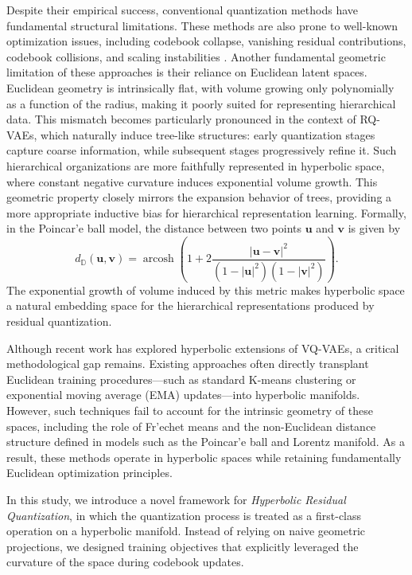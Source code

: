 \documentclass[12pt]{report}
\begin{document}
Despite their empirical success, conventional quantization methods have fundamental structural limitations. These methods are also prone to well-known optimization issues, including codebook collapse, vanishing residual contributions, codebook collisions, and scaling instabilities \cite{collapse_1}.
Another fundamental geometric limitation of these approaches is their reliance on Euclidean latent spaces. Euclidean geometry is intrinsically flat, with volume growing only polynomially as a function of the radius, making it poorly suited for representing hierarchical data. This mismatch becomes particularly pronounced in the context of RQ-VAEs, which naturally induce tree-like structures: early quantization stages capture coarse information, while subsequent stages progressively refine it. Such hierarchical organizations are more faithfully represented in hyperbolic space, where constant negative curvature induces exponential volume growth. This geometric property closely mirrors the expansion behavior of trees, providing a more appropriate inductive bias for hierarchical representation learning.
Formally, in the Poincar'e ball model, the distance between two points $\mathbf{u}$ and $\mathbf{v}$ is given by
\begin{equation}
    d_{\mathbb{D}}(\mathbf{u}, \mathbf{v}) = \operatorname{arcosh} \left( 1 + 2 \frac{|\mathbf{u} - \mathbf{v}|^2}{(1 - |\mathbf{u}|^2)(1 - |\mathbf{v}|^2)} \right).
\end{equation}
The exponential growth of volume induced by this metric makes hyperbolic space a natural embedding space for the hierarchical representations produced by residual quantization.

Although recent work has explored hyperbolic extensions of VQ-VAEs, a critical methodological gap remains. Existing approaches often directly transplant Euclidean training procedures—such as standard K-means clustering or exponential moving average (EMA) updates—into hyperbolic manifolds. However, such techniques fail to account for the intrinsic geometry of these spaces, including the role of Fr'echet means and the non-Euclidean distance structure defined in models such as the Poincar'e ball and Lorentz manifold. As a result, these methods operate in hyperbolic spaces while retaining fundamentally Euclidean optimization principles.


In this study, we introduce a novel framework for \emph{Hyperbolic Residual Quantization}, in which the quantization process is treated as a first-class operation on a hyperbolic manifold. Instead of relying on naive geometric projections, we designed training objectives that explicitly leveraged the curvature of the space during codebook updates.
\end{document}
